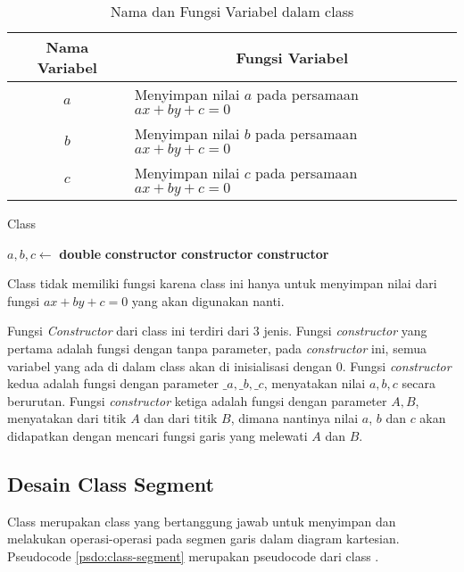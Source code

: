\begin{table}[htb]
	\Centering
	\caption{Nama dan Fungsi Variabel dalam class }
	\begin{tabular}{|c|p{7cm}|}
	\hline
	Nama Variabel & \multicolumn{1}{c|}{Fungsi Variabel}                               \\ \hline
$a$           & Menyimpan nilai $a$ pada persamaan $ax + by + c =0$ \\ \hline
$b$           & Menyimpan nilai $b$ pada persamaan $ax + by + c =0$          \\ \hline
$c$           & Menyimpan nilai $c$ pada persamaan $ax + by + c =0$          \\ \hline
	\end{tabular}
	\label{tab:var-line}
\end{table}
\begin{algorithm}
	\caption{Class }
	\label{psdo:class-line}
	\begin{algorithmic}[1]
        \State $ a, b, c \leftarrow $ \textbf{double}
		\State \textbf{constructor} 
        \State \textbf{constructor} 
        \State \textbf{constructor} 
	\end{algorithmic}
\end{algorithm}

Class  tidak memiliki fungsi karena class ini hanya untuk menyimpan nilai dari fungsi $ax+by+c=0$ yang akan digunakan nanti.

Fungsi \textit{Constructor} dari class ini terdiri dari 3 jenis. Fungsi \textit{constructor} yang pertama adalah fungsi dengan tanpa parameter, pada \textit{constructor} ini, semua variabel yang ada di dalam class  akan di inisialisasi dengan $0$. Fungsi \textit{constructor} kedua adalah fungsi dengan parameter $\_a, \_b, \_c$, menyatakan nilai $a, b, c$ secara berurutan. Fungsi \textit{constructor} ketiga adalah fungsi dengan parameter $A, B$, menyatakan  dari titik $A$ dan  dari titik $B$, dimana nantinya nilai $a$, $b$ dan $c$ akan didapatkan dengan mencari fungsi garis yang melewati  $A$ dan  $B$.

\subsection{ Desain Class Segment}
\label{sec:segment}
Class  merupakan class yang bertanggung jawab untuk menyimpan dan melakukan operasi-operasi pada segmen garis dalam diagram kartesian. Pseudocode \ref{psdo:class-segment} merupakan pseudocode dari class . 


